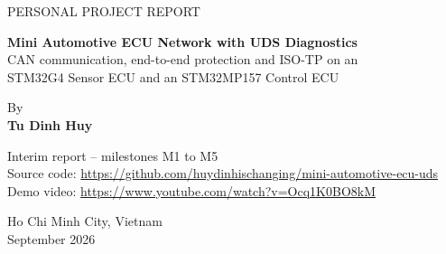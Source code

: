 \begin{titlepage}
    \begin{center}
        \vspace*{2.5cm}

        \Large
        PERSONAL PROJECT REPORT

        \vspace{2.0cm}

        \Huge
        \textbf{Mini Automotive ECU Network with UDS Diagnostics}\\[0.8cm]
        \Large
        CAN communication, end-to-end protection and ISO-TP on an\\
        STM32G4 Sensor ECU and an STM32MP157 Control ECU

        \vspace{2.4cm}

        \Large
        By\\
        \textbf{Tu Dinh Huy}

        \vspace{1.2cm}

        \large
        Interim report -- milestones M1 to M5\\[0.3cm]
        Source code: \url{https://github.com/huydinhischanging/mini-automotive-ecu-uds}\\[0.1cm]
        Demo video: \url{https://www.youtube.com/watch?v=Ocq1K0BO8kM}

        \vfill
        Ho Chi Minh City, Vietnam\\
        September 2026

    \end{center}
\end{titlepage}
